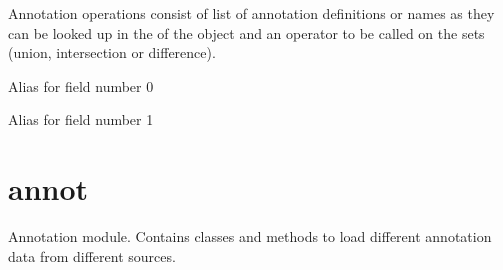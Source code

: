 \documentclass[letterpaper,10pt,english]{sphinxmanual}
\begin{document}

\begin{fulllineitems}
\label{\detokenize{reference:pypath.annot_formats.AnnotOp}}
Annotation operations consist of list of annotation definitions or
names as they can be looked up in the  of the
 object and an operator to be called on the sets
(union, intersection or difference).

\begin{fulllineitems}
\label{\detokenize{reference:pypath.annot_formats.AnnotOp.annots}}
Alias for field number 0

\end{fulllineitems}


\begin{fulllineitems}
\label{\detokenize{reference:pypath.annot_formats.AnnotOp.op}}
Alias for field number 1

\end{fulllineitems}


\end{fulllineitems}



\section{annot}
\label{\detokenize{reference:module-pypath.annot}}\label{\detokenize{reference:annot}}
Annotation module. Contains classes and methods to load different
annotation data from different sources.

\begin{fulllineitems}
\label{\detokenize{reference:pypath.annot.Adhesome}}
\end{fulllineitems}
\end{document}
